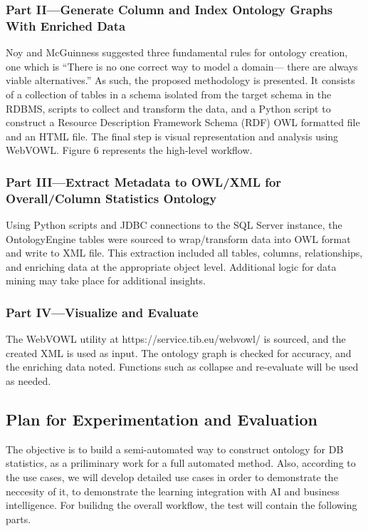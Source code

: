 \documentclass[sigconf]{acmart}
\begin{document}
\subsubsection{Part II—Generate Column and Index Ontology Graphs With Enriched Data}
Noy and McGuinness \cite{noy2001ontology} suggested three fundamental rules for ontology creation, one which is “There is no one correct way to model a domain— there are always viable alternatives.” As such, the proposed methodology is presented. It consists of a collection of tables in a schema isolated from the target schema in the RDBMS, scripts to collect and transform the data, and a Python script to construct a Resource Description Framework Schema (RDF) OWL formatted file and an HTML file. The final step is visual representation and analysis using WebVOWL. Figure 6 represents the high-level workflow.

\subsubsection{Part III—Extract Metadata to OWL/XML for Overall/Column Statistics Ontology}
Using Python scripts and JDBC connections to the SQL Server instance, the OntologyEngine tables were sourced to wrap/transform data into OWL format and write to XML file. This extraction included all tables, columns, relationships, and enriching data at the appropriate object level. Additional logic for data mining may take place for additional insights.

\subsubsection{Part IV—Visualize and Evaluate}
The WebVOWL utility at https://service.tib.eu/webvowl/ is sourced, and the created XML is used as input. The ontology graph is checked for accuracy, and the enriching data noted. Functions such as collapse and re-evaluate will be used as needed.

\subsection{Plan for Experimentation and Evaluation}
The objective is to build a semi-automated way to construct ontology for DB statistics, as a priliminary work for a full automated method. Also, according to the use cases, we will develop detailed use cases in order to demonstrate the neccesity of it, to demonstrate the learning integration with AI and business intelligence. For builidng the overall workflow, the test will contain the following parts.
\end{document}
